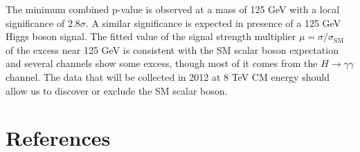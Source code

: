 \documentclass{cimento}
\begin{document}
The minimum combined p-value is observed at a mass of 125 GeV with a local
significance of $2.8\sigma$.  A similar significance is expected in
presence of a 125 GeV Higgs boson signal.  
The fitted value of the signal strength multiplier
$\mu=\sigma/\sigma_{\mathrm{SM}}$ of the excess near 125 GeV is
consistent with the SM scalar boson expectation and several channels
show some excess, though most of it comes from the
$H \to \gamma\gamma$ channel.  The data that will be collected in 2012
at 8 TeV CM energy should allow us to discover or exclude the SM
scalar boson.

\section*{References}
\end{document}
